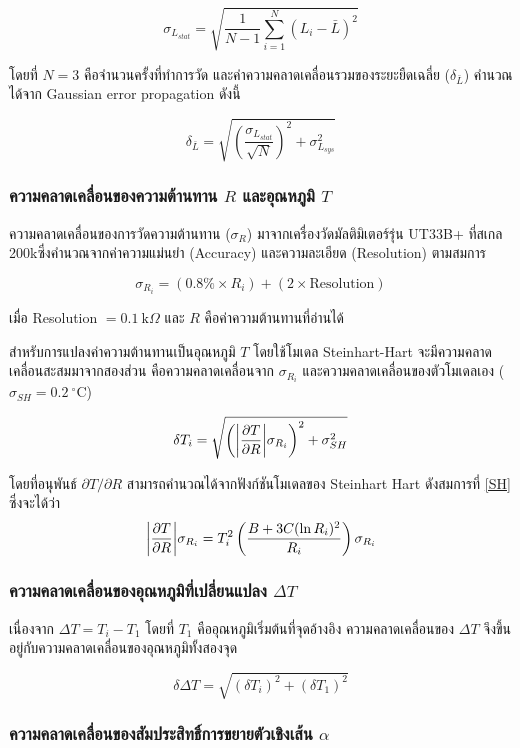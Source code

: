 \documentclass[11pt,a4paper]{article}
\begin{document}
\[
\sigma_{L_{stat}} = \sqrt{\frac{1}{N-1}\sum_{i=1}^{N}(L_i-\bar{L})^2}
\]

โดยที่ $N=3$ คือจำนวนครั้งที่ทำการวัด และค่าความคลาดเคลื่อนรวมของระยะยืดเฉลี่ย ($\delta_{\bar L}$) คำนวณได้จาก Gaussian error propagation \cite{Taylor} ดังนี้

\[
\delta_{\bar L} = \sqrt{\left(\frac{\sigma_{L_{stat}}}{\sqrt{N}}\right)^2 + \sigma_{L_{sys}}^2}
\]

\subsubsection{ความคลาดเคลื่อนของความต้านทาน $R$ และอุณหภูมิ $T$}

ความคลาดเคลื่อนของการวัดความต้านทาน ($\sigma_R$) มาจากเครื่องวัดมัลติมิเตอร์รุ่น UT33B+ \cite{UT33B} ที่สเกล 200k\ohm ซึ่งคำนวณจากค่าความแม่นยำ (Accuracy) และความละเอียด (Resolution) ตามสมการ

\[
\sigma_{R_i} = (0.8\% \times R_i) + (2 \times \text{Resolution})
\]

เมื่อ Resolution $= 0.1\ \text{k}\Omega$ และ $R$ คือค่าความต้านทานที่อ่านได้

สำหรับการแปลงค่าความต้านทานเป็นอุณหภูมิ $T$ โดยใช้โมเดล Steinhart-Hart จะมีความคลาดเคลื่อนสะสมมาจากสองส่วน คือความคลาดเคลื่อนจาก $\sigma_{R_i}$ และความคลาดเคลื่อนของตัวโมเดลเอง ($\sigma_{SH} = 0.2\ ^\circ\text{C}$)

\[
\delta T_i = \sqrt{ \left( \abs{\frac{\partial T}{\partial R}} \sigma_{R_i} \right)^2 + \sigma_{SH}^2 }
\]

โดยที่อนุพันธ์ $\partial T/\partial R$ สามารถคำนวณได้จากฟังก์ชันโมเดลของ Steinhart Hart ดังสมการที่ \ref{SH} ซึ่งจะได้ว่า
\begin{equation}
    \abs{\frac{\partial{T}}{\partial{R}}} \sigma_{R_i} = T_i^2 \left( \frac{B + 3C(\ln R_i)^2}{R_i} \right) \sigma_{R_i}
\end{equation}

\subsubsection{ความคลาดเคลื่อนของอุณหภูมิที่เปลี่ยนแปลง $\Delta T$}

เนื่องจาก $\Delta T = T_i - T_1$ โดยที่ $T_1$ คืออุณหภูมิเริ่มต้นที่จุดอ้างอิง ความคลาดเคลื่อนของ $\Delta T$ จึงขึ้นอยู่กับความคลาดเคลื่อนของอุณหภูมิทั้งสองจุด

\[
\delta \Delta T = \sqrt{(\delta T_i)^2 + (\delta T_1)^2}
\]

\subsubsection{ความคลาดเคลื่อนของสัมประสิทธิ์การขยายตัวเชิงเส้น $\alpha$}
\end{document}
